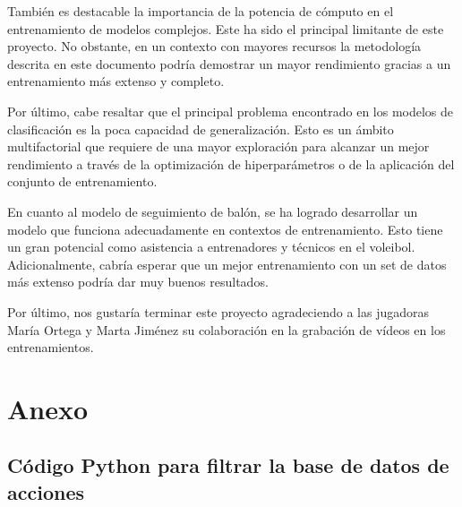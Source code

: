 \documentclass[12pt]{report} %
\begin{document}
    También es destacable la importancia de la potencia de cómputo en el entrenamiento de modelos complejos. Este ha sido el principal limitante de este proyecto. No obstante, en un contexto con mayores recursos la metodología descrita en este documento podría demostrar un mayor rendimiento gracias a un entrenamiento más extenso y completo.

    Por último, cabe resaltar que el principal problema encontrado en los modelos de clasificación es la poca capacidad de generalización. Esto es un ámbito multifactorial que requiere de una mayor exploración para alcanzar un mejor rendimiento a través de la optimización de hiperparámetros o de la aplicación del conjunto de entrenamiento.

    En cuanto al modelo de seguimiento de balón, se ha logrado desarrollar un modelo que funciona adecuadamente en contextos de entrenamiento. Esto tiene un gran potencial como asistencia a entrenadores y técnicos en el voleibol. Adicionalmente, cabría esperar que un mejor entrenamiento con un set de datos más extenso podría dar muy buenos resultados.

    Por último, nos gustaría terminar este proyecto agradeciendo a las jugadoras María Ortega y Marta Jiménez su colaboración en la grabación de vídeos en los entrenamientos.



    \clearpage

    \label{chap:bibliography}
    \printbibliography


    \chapter*{Anexo}
    \label{anexo}

    \section*{Código Python para filtrar la base de datos de acciones}
    \label{filtrado_script}
    
\end{document}
